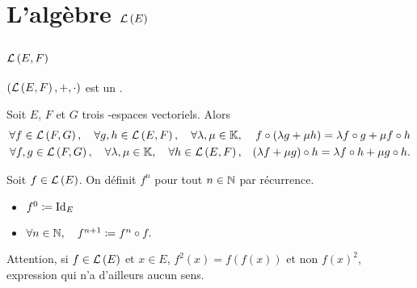 \documentclass{magnolia}
\begin{document}
\section{L'algèbre $\mathcal{L}\left(E\right)$}

\subsection{$\mathcal{L}\left(E,F\right)$}

\begin{proposition}[utile=-3]
$\left(\mathcal{L}\left(E,F\right),+,\cdot\right)$ est un \Kev.
\end{proposition}

\begin{proposition}
Soit $E$, $F$ et $G$ trois \K-espaces vectoriels. Alors
\begin{eqnarray*}
\forall f\in\mathcal{L}\left(F,G\right),\quad \forall g,h\in\mathcal{L}\left(E,F\right),\quad \forall \lambda,\mu\in\mathbb{K},& &
f\circ\left(\lambda g+\mu h\right)=\lambda f\circ g+\mu f\circ h\\
\forall f,g\in\mathcal{L}\left(F,G\right),\quad \forall \lambda,\mu\in\mathbb{K} ,\quad \forall h\in\mathcal{L}\left(E,F\right),& &
\left(\lambda f+\mu g\right)\circ h=\lambda f\circ h+\mu g\circ h.
\end{eqnarray*}
\end{proposition}


\begin{definition}
Soit $f\in\mathcal{L}\left(E\right)$. On définit $f^n$ pour tout $n\in\mathbb{N}$ par récurrence.
\begin{itemize}
\item $f^0\coloneqq{\rm Id}_E$
\item $\forall n\in\mathbb{N},\quad f^{n+1}\coloneqq f^n\circ f.$
\end{itemize}
\end{definition}

\begin{remarqueUnique}
\remarque Attention, si $f\in\mathcal{L}\left(E\right)$ et $x\in E$, $f^2(x)=f(f(x))$ et non $f(x)^2$, expression qui n'a
  d'ailleurs aucun sens.
\end{remarqueUnique}
\end{document}
